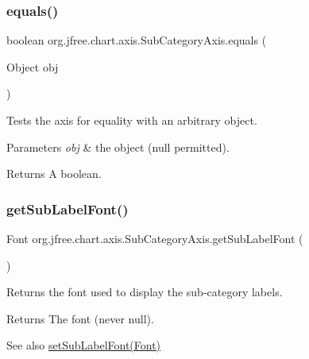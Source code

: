 \subsubsection{\texorpdfstring{equals()}{equals()}}
{\footnotesize\ttfamily boolean org.\+jfree.\+chart.\+axis.\+Sub\+Category\+Axis.\+equals (\begin{DoxyParamCaption}\item[{Object}]{obj }\end{DoxyParamCaption})}

Tests the axis for equality with an arbitrary object.


\begin{DoxyParams}{Parameters}
{\em obj} & the object ({\ttfamily null} permitted).\\
\hline
\end{DoxyParams}
\begin{DoxyReturn}{Returns}
A boolean. 
\end{DoxyReturn}
\mbox{\label{classorg_1_1jfree_1_1chart_1_1axis_1_1_sub_category_axis_a8ba516ab1bc79bf6b3f2a0e98e25f759}} 
\subsubsection{\texorpdfstring{get\+Sub\+Label\+Font()}{getSubLabelFont()}}
{\footnotesize\ttfamily Font org.\+jfree.\+chart.\+axis.\+Sub\+Category\+Axis.\+get\+Sub\+Label\+Font (\begin{DoxyParamCaption}{ }\end{DoxyParamCaption})}

Returns the font used to display the sub-\/category labels.

\begin{DoxyReturn}{Returns}
The font (never {\ttfamily null}).
\end{DoxyReturn}
\begin{DoxySeeAlso}{See also}
\mbox{\hyperlink{classorg_1_1jfree_1_1chart_1_1axis_1_1_sub_category_axis_a1b3e317afd77a78715ddcf1465be1461}{set\+Sub\+Label\+Font(\+Font)}} 
\end{DoxySeeAlso}
\mbox{\label{classorg_1_1jfree_1_1chart_1_1axis_1_1_sub_category_axis_aef43f68433c27fb74ddc51d40681f91e}} 
